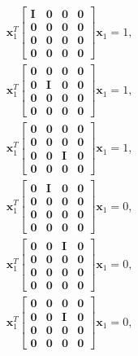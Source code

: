 \documentclass{article}
\newcommand{\mbf}[1]{\mathbf{#1}}
\newcommand{\bbm}{\begin{bmatrix}}
\newcommand{\ebm}{\end{bmatrix}}
\begin{document}
\begin{align}
    \mbf{x}_1^T  \bbm \mbf{I} & \mbf{0} & \mbf{0} & \mbf{0} \\ \mbf{0} & \mbf{0} & \mbf{0} & \mbf{0} \\ \mbf{0} & \mbf{0} & \mbf{0} & \mbf{0} \\ \mbf{0} & \mbf{0} & \mbf{0} & \mbf{0} \ebm \mbf{x}_1 = 1,\\
    \mbf{x}_1^T  \bbm \mbf{0} & \mbf{0} & \mbf{0} & \mbf{0} \\ \mbf{0} & \mbf{I} & \mbf{0} & \mbf{0} \\ \mbf{0} & \mbf{0} & \mbf{0} & \mbf{0} \\ \mbf{0} & \mbf{0} & \mbf{0} & \mbf{0} \ebm \mbf{x}_1 = 1,\\
    \mbf{x}_1^T  \bbm \mbf{0} & \mbf{0} & \mbf{0} & \mbf{0} \\ \mbf{0} & \mbf{0} & \mbf{0} & \mbf{0} \\ \mbf{0} & \mbf{0} & \mbf{I} & \mbf{0} \\ \mbf{0} & \mbf{0} & \mbf{0} & \mbf{0} \ebm \mbf{x}_1 = 1,\\
    \mbf{x}_1^T  \bbm \mbf{0} & \mbf{I} & \mbf{0} & \mbf{0} \\ \mbf{0} & \mbf{0} & \mbf{0} & \mbf{0} \\ \mbf{0} & \mbf{0} & \mbf{0} & \mbf{0} \\ \mbf{0} & \mbf{0} & \mbf{0} & \mbf{0} \ebm \mbf{x}_1 = 0,\\
    \mbf{x}_1^T  \bbm \mbf{0} & \mbf{0} & \mbf{I} & \mbf{0} \\ \mbf{0} & \mbf{0} & \mbf{0} & \mbf{0} \\ \mbf{0} & \mbf{0} & \mbf{0} & \mbf{0} \\ \mbf{0} & \mbf{0} & \mbf{0} & \mbf{0} \ebm \mbf{x}_1 = 0,\\
    \mbf{x}_1^T  \bbm \mbf{0} & \mbf{0} & \mbf{0} & \mbf{0} \\ \mbf{0} & \mbf{0} & \mbf{I} & \mbf{0} \\ \mbf{0} & \mbf{0} & \mbf{0} & \mbf{0} \\ \mbf{0} & \mbf{0} & \mbf{0} & \mbf{0} \ebm \mbf{x}_1 = 0,\\
\end{align}
\end{document}
